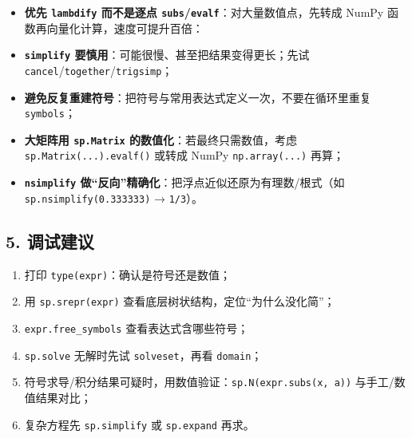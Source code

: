 \begin{itemize}
\item
  \textbf{优先 \texttt{lambdify} 而不是逐点
  \texttt{subs}/\texttt{evalf}}：对大量数值点，先转成 NumPy
  函数再向量化计算，速度可提升百倍：

\begin{Shaded}
\begin{Highlighting}[]
\OperatorTok{=}\NormalTok{)}
\OperatorTok{=}\OperatorTok{/}\NormalTok{)}
\OperatorTok{=}\NormalTok{, }\NormalTok{, }\NormalTok{)}
\OperatorTok{=}
\end{Highlighting}
\end{Shaded}
\item
  \textbf{\texttt{simplify} 要慎用}：可能很慢、甚至把结果变得更长；先试
  \texttt{cancel}/\texttt{together}/\texttt{trigsimp}；
\item
  \textbf{避免反复重建符号}：把符号与常用表达式定义一次，不要在循环里重复
  \texttt{symbols}；
\item
  \textbf{大矩阵用 \texttt{sp.Matrix} 的数值化}：若最终只需数值，考虑
  \texttt{sp.Matrix(...).evalf()} 或转成 NumPy \texttt{np.array(...)}
  再算；
\item
  \textbf{\texttt{nsimplify}
  做``反向''精确化}：把浮点近似还原为有理数/根式（如
  \texttt{sp.nsimplify(0.333333)} → \texttt{1/3}）。
\end{itemize}

\subsection{5. 调试建议}\label{ux8c03ux8bd5ux5efaux8bae-1}

\begin{enumerate}
\def\labelenumi{\arabic{enumi}.}
\tightlist
\item
  打印 \texttt{type(expr)}：确认是符号还是数值；
\item
  用 \texttt{sp.srepr(expr)} 查看底层树状结构，定位``为什么没化简''；
\item
  \texttt{expr.free\_symbols} 查看表达式含哪些符号；
\item
  \texttt{sp.solve} 无解时先试 \texttt{solveset}，再看 \texttt{domain}；
\item
  符号求导/积分结果可疑时，用数值验证：\texttt{sp.N(expr.subs(x,\ a))}
  与手工/数值结果对比；
\item
  复杂方程先 \texttt{sp.simplify} 或 \texttt{sp.expand} 再求。
\end{enumerate}

